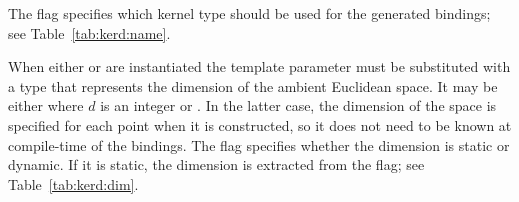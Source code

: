 The \cmake{} flag  specifies which kernel type should be used for the generated bindings; see Table~\ref{tab:kerd:name}.

\begin{table}[!htp]
  \caption{$d$-dimensional Kernel name options.}
  \centering{}
 \label{tab:kerd:name}
\end{table}

When either  or  are instantiated the template parameter must be substituted with a type that represents the dimension of the ambient Euclidean space. It may be either  where $d$ is an integer or . In the latter case, the dimension of the space is specified for each point when it is constructed, so it does not need to be known at compile-time of the bindings. The \cmake{}  flag specifies whether the dimension is static or dynamic. If it is static, the dimension is extracted from the  \cmake{} flag; see Table~\ref{tab:kerd:dim}.

\begin{table}[!htp]
  \caption{$d$-dimensional Kernel dimension tag options.}
  \centering{}
 \label{tab:kerd:dim}
\end{table}


